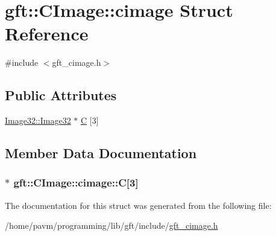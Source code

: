 \hypertarget{structgft_1_1CImage_1_1cimage}{\section{gft\-:\-:C\-Image\-:\-:cimage Struct Reference}
\label{structgft_1_1CImage_1_1cimage}
}


{\ttfamily \#include $<$gft\-\_\-cimage.\-h$>$}

\subsection*{Public Attributes}
\begin{DoxyCompactItemize}
\item 
\hyperlink{namespacegft_1_1Image32_a6c5a03566b593bb406f1fe33266a0382}{Image32\-::\-Image32} $\ast$ \hyperlink{structgft_1_1CImage_1_1cimage_a01068881b258a498dee3c449dd58c174}{C} \mbox{[}3\mbox{]}
\end{DoxyCompactItemize}


\subsection{Member Data Documentation}
\hypertarget{structgft_1_1CImage_1_1cimage_a01068881b258a498dee3c449dd58c174}{
\subsubsection[{C}]{$\ast$ gft\-::\-C\-Image\-::cimage\-::\-C\mbox{[}3\mbox{]}}}\label{structgft_1_1CImage_1_1cimage_a01068881b258a498dee3c449dd58c174}


The documentation for this struct was generated from the following file\-:\begin{DoxyCompactItemize}
\item 
/home/pavm/programming/lib/gft/include/\hyperlink{gft__cimage_8h}{gft\-\_\-cimage.\-h}\end{DoxyCompactItemize}
